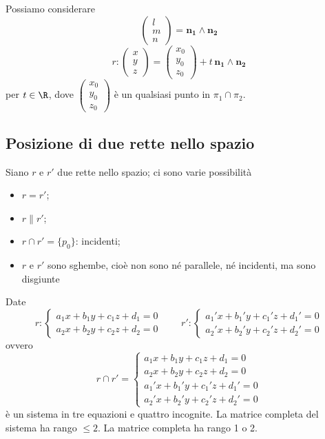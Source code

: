 {Possiamo considerare \[
    \begin{pmatrix}
        l \\ m \\ n
    \end{pmatrix} = \mathbf{n_1} \wedge \mathbf{n_2}
\]
\begin{equation}
    r:\begin{pmatrix}
        x \\ y \\ z
    \end{pmatrix}=\begin{pmatrix}
        x_0 \\ y_0 \\ z_0
    \end{pmatrix} + t\, \mathbf{n_1} \wedge \mathbf{n_2}
\end{equation} per $ t \in \R $, dove $ \begin{pmatrix}
    x_0 \\ y_0 \\ z_0
\end{pmatrix} $ è un qualsiasi punto in $ \pi_1\cap\pi_2 $.
}

\subsection{Posizione di due rette nello spazio}

Siano $ r $ e $ r' $ due rette nello spazio; ci sono varie possibilità
\begin{itemize}
    \item $ r=r' $;
    \item $ r\parallel r' $;
    \item $ r\cap r' =\{p_0\} $: incidenti;
    \item $ r $ e $ r'$ sono sghembe, cioè non sono né parallele, né incidenti, ma sono disgiunte
\end{itemize}

Date \[
    r:\begin{cases}
        a_1x+b_1y+c_1z+d_1=0\\
        a_2x+b_2y+c_2z+d_2=0
    \end{cases} \qquad r':\begin{cases}
        a_1'x+b_1'y+c_1'z+d_1'=0\\
        a_2'x+b_2'y+c_2'z+d_2'=0
    \end{cases}
\]
ovvero
\[
    r\cap r' =\begin{cases}
        a_1x+b_1y+c_1z+d_1=0\\
        a_2x+b_2y+c_2z+d_2=0\\
        a_1'x+b_1'y+c_1'z+d_1'=0\\
        a_2'x+b_2'y+c_2'z+d_2'=0
    \end{cases}
\]
è un sistema in tre equazioni e quattro incognite. La matrice completa del sistema ha rango $ \le 2 $. La matrice completa ha rango 1 o 2.

